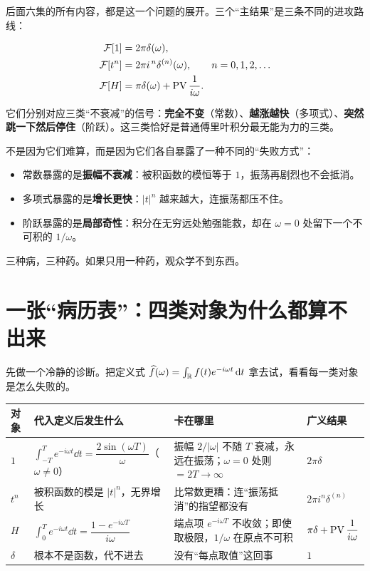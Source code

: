 后面六集的所有内容，都是这一个问题的展开。三个“主结果”是三条不同的进攻路线：

\begin{align}
\mathcal{F}[1]&=2\pi\delta(\omega), \label{eq:main1}\\
\mathcal{F}[t^{n}]&=2\pi i^{\,n}\delta^{(n)}(\omega),\qquad n=0,1,2,\dots \label{eq:main2}\\
\mathcal{F}[H]&=\pi\delta(\omega)+\operatorname{PV}\frac{1}{i\omega}. \label{eq:main3}
\end{align}

它们分别对应三类“不衰减”的信号：\textbf{完全不变}（常数）、\textbf{越涨越快}（多项式）、\textbf{突然跳一下然后停住}（阶跃）。这三类恰好是普通傅里叶积分最无能为力的三类。

\begin{notebox}[这三条式子为什么值得拍六集]
不是因为它们难算，而是因为它们各自暴露了一种不同的“失败方式”：
\begin{itemize}[leftmargin=1.4em,itemsep=0.15em,topsep=0.2em]
\item 常数暴露的是\textbf{振幅不衰减}：被积函数的模恒等于 $1$，振荡再剧烈也不会抵消。
\item 多项式暴露的是\textbf{增长更快}：$|t|^{n}$ 越来越大，连振荡都压不住。
\item 阶跃暴露的是\textbf{局部奇性}：积分在无穷远处勉强能救，却在 $\omega=0$ 处留下一个不可积的 $1/\omega$。
\end{itemize}
三种病，三种药。如果只用一种药，观众学不到东西。
\end{notebox}

\section{一张“病历表”：四类对象为什么都算不出来}

先做一个冷静的诊断。把定义式 $\widehat{f}(\omega)=\int_{\mathbb{R}}f(t)e^{-i\omega t}\mathop{}\!\mathrm{d} t$ 拿去试，看看每一类对象是怎么失败的。

\begin{center}
\small
\renewcommand{\arraystretch}{1.5}
\begin{tabularx}{\textwidth}{@{}L{1.5cm}L{4.6cm}L{5.4cm}L{3.2cm}@{}}
\toprule
对象 & 代入定义后发生什么 & 卡在哪里 & 广义结果 \\
\midrule
$1$ & $\int_{-T}^{T}e^{-i\omega t}\dd t=\dfrac{2\sin(\omega T)}{\omega}$（$\omega\neq0$） & 振幅 $2/|\omega|$ 不随 $T$ 衰减，永远在振荡；$\omega=0$ 处则 $=2T\to\infty$ & $2\pi\delta$ \\
$t^{n}$ & 被积函数的模是 $|t|^{n}$，无界增长 & 比常数更糟：连“振荡抵消”的指望都没有 & $2\pi i^{n}\delta^{(n)}$ \\
$H$ & $\int_{0}^{T}e^{-i\omega t}\dd t=\dfrac{1-e^{-i\omega T}}{i\omega}$ & 端点项 $e^{-i\omega T}$ 不收敛；即使取极限，$1/\omega$ 在原点不可积 & $\pi\delta+\operatorname{PV}\dfrac{1}{i\omega}$ \\
$\delta$ & 根本不是函数，代不进去 & 没有“每点取值”这回事 & $1$ \\
\bottomrule
\end{tabularx}
\end{center}

